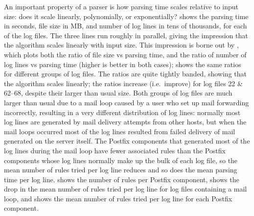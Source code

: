 An important property of a parser is how parsing time scales relative to
input size: does it scale linearly, polynomially, or exponentially?
 shows the
parsing time in seconds, file size in MB, and number of log lines in tens
of thousands, for each of the \numberOFlogFILES{} log files.  The three
lines run roughly in parallel, giving the impression that the algorithm
scales linearly with input size.  This impression is borne out by
, which
plots both the ratio of file size vs parsing time, and the ratio of number
of log lines vs parsing time (higher is better in both cases);
shows the same ratios for different groups of log files.  The ratios are
quite tightly banded, showing that the algorithm scales linearly; the
ratios increase (i.e.\ improve) for log files 22 \& 62--68, despite their
larger than usual size.  Both groups of log files are much larger than
usual due to a mail loop caused by a user who set up mail forwarding
incorrectly, resulting in a very different distribution of log lines:
normally most log lines are generated by mail delivery attempts from other
hosts, but when the mail loops occurred most of the log lines resulted from
failed delivery of mail generated on the server itself.  The Postfix
components that generated most of the log lines during the mail loop have
fewer associated rules than the Postfix components whose log lines normally
make up the bulk of each log file, so the mean number of rules tried per
log line reduces and so does the mean parsing time per log line.
 shows the number of rules
per Postfix component, 
shows the drop in the mean number of rules tried per log line for log files
containing a mail loop, and  shows the mean number of rules tried per
log line for each Postfix component.



